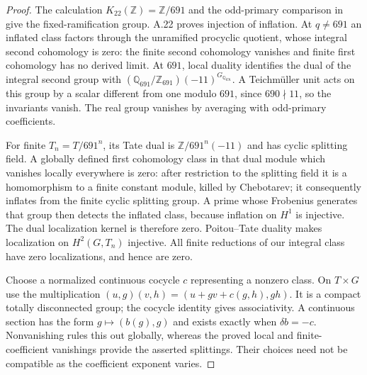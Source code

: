 \begin{proof}
The calculation $K_{22}(\mathbb Z)=\mathbb Z/691$ and the odd-primary
comparison in \cite[VI.8.2, VI.10.3]{CohWeibelKbook} give the
fixed-ramification group. A.22 proves injection of inflation.
At $q\ne691$ an inflated class factors through the unramified
procyclic quotient, whose integral second cohomology is zero: the
finite second cohomology vanishes and finite first cohomology has no
derived limit. At $691$, local duality identifies the dual of the
integral second group with
$(\mathbb Q_{691}/\mathbb Z_{691})(-11)^{G_{\mathbb Q_{691}}}$.
A Teichm\"uller unit acts on this group by a scalar different from
one modulo $691$, since $690\nmid11$, so the invariants vanish.
The real group vanishes by averaging with odd-primary coefficients.

For finite $T_n=T/691^n$, its Tate dual is
$\mathbb Z/691^n(-11)$ and has cyclic splitting field. A globally
defined first cohomology class in that dual module which vanishes
locally everywhere is zero: after restriction to the splitting field
it is a homomorphism to a finite constant module, killed by
Chebotarev; it consequently inflates from the finite cyclic splitting
group. A prime whose Frobenius generates that group then detects the
inflated class, because inflation on $H^1$ is injective. The dual
localization kernel is therefore zero. Poitou--Tate duality
\cite[I.4.10(a), pp.56--57]{CohMilneADT} makes localization on
$H^2(G,T_n)$ injective. All finite reductions of our integral class
have zero localizations, and hence are zero.

Choose a normalized continuous cocycle $c$ representing a nonzero
class. On $T\times G$ use the multiplication
$(u,g)(v,h)=(u+gv+c(g,h),gh)$. It is a compact totally disconnected
group; the cocycle identity gives associativity. A continuous section
has the form $g\mapsto(b(g),g)$ and exists exactly when
$\delta b=-c$. Nonvanishing rules this out globally, whereas the
proved local and finite-coefficient vanishings provide the asserted
splittings. Their choices need not be compatible as the coefficient
exponent varies.
\end{proof}


